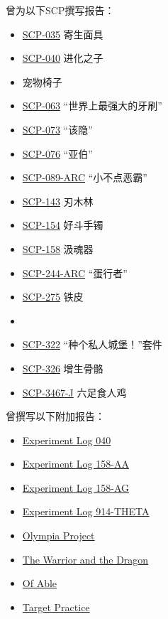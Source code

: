 曾为以下SCP撰写报告：

\begin{itemize}
	\item \hyperref[chap:SCP-035]{SCP-035} 寄生面具
	\item \hyperref[chap:SCP-040]{SCP-040} 进化之子
	\item {} 宠物椅子
	\item \hyperref[chap:SCP-063]{SCP-063} “世界上最强大的牙刷”
	\item \hyperref[chap:SCP-073]{SCP-073} “该隐”
	\item \hyperref[chap:SCP-076]{SCP-076} “亚伯”
	\item \hyperref[chap:]{SCP-089-ARC} “小不点恶霸”
	\item \hyperref[chap:SCP-143]{SCP-143} 刃木林
	\item \hyperref[chap:SCP-154]{SCP-154} 好斗手镯
	\item \hyperref[chap:SCP-158]{SCP-158} 汲魂器
	\item \hyperref[chap:]{SCP-244-ARC} “蛋行者”
	\item \hyperref[chap:SCP-275]{SCP-275} 铁皮
	\item {}
	\item \hyperref[chap:SCP-322]{SCP-322} “种个私人城堡！”套件
	\item \hyperref[chap:SCP-326]{SCP-326} 增生骨骼
	\item \hyperref[chap:]{SCP-3467-J} 六足食人鸡
\end{itemize}

曾撰写以下附加报告：

\begin{itemize}
	\item \hyperref[sec:DOC-experiment-log-040]{Experiment Log 040}
	\item \hyperref[sec:DOC-experiment-log-158-aa]{Experiment Log 158-AA}
	\item \hyperref[sec:DOC-experiment-log-158-ag]{Experiment Log 158-AG}
	\item \hyperref[sec:DOC-experiment-log-914-theta]{Experiment Log 914-THETA}
	\item \hyperref[chap:COMP-olympia-project]{Olympia Project}
	\item \hyperref[chap:TALE-the-warrior-and-the-dragon]{The Warrior and the Dragon}
	\item \hyperref[chap:TALE-of-able]{Of Able}
	\item \hyperref[chap:TALE-target-practice]{Target Practice}
\end{itemize}
